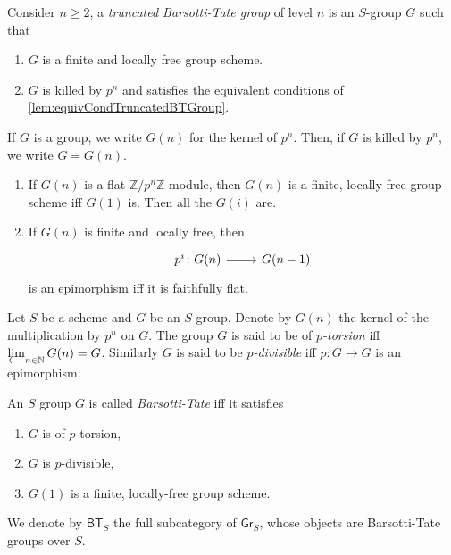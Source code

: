 \documentclass[../Main]{subfiles}
\begin{document}
\begin{defn}
	Consider $n \geq 2$, a {\em truncated Barsotti-Tate group} of level $n$
	is an $S$-group $G$ such that
\begin{enumerate}
	\item $G$ is a finite and locally free group scheme.
	\item $G$ is killed by $p^n$ and satisfies the equivalent conditions of 
		\cref{lem:equivCondTruncatedBTGroup}.
\end{enumerate}
\end{defn}


\begin{defn}[]
	If $G$ is a group, we write $G(n)$ for the kernel of $p^n$.
	Then, if $G$ is killed by $p^n$, we write $G = G(n)$.
\end{defn}


\begin{lem}\leavevmode\vspace{-.2\baselineskip}
\begin{enumerate}
	\item If $G(n)$ is a flat $\mathbb{Z}/p^n\mathbb{Z}$-module, then $G(n)$
		is a finite, locally-free group scheme iff
		$G(1)$ is. Then all the $G(i)$ are.

	\item If $G(n)$ is finite and locally free, then
		\begin{equation}
		\begin{tikzcd}[row sep = 0ex
			,/tikz/column 1/.append style={anchor=base east}
			,/tikz/column 2/.append style={anchor=base west}]
			p^i\colon G(n) \arrow[r, "", rightarrow] &
			G(n-1)
		\end{tikzcd}
		\end{equation} 
		is an epimorphism iff it is faithfully flat.
\end{enumerate}
\end{lem} 


\begin{defn}
	Let $S$ be a scheme and $G$ be an $S$-group.
	Denote by $G(n)$ the kernel of the multiplication by $p^n$ on $G$.
	The group $G$ is said to be of {\em $p$-torsion} iff $\varprojlim_{n \in \mathbb{N}} G(n) = G$.
	Similarly $G$ is said to be {\em $p$-divisible} iff $p\colon G \to G$
	is an epimorphism.
\end{defn}


\begin{defn}\label{BTGroup}
	An $S$ group $G$ is called {\em Barsotti-Tate} iff it satisfies
\begin{enumerate}
	\item $G$ is of $p$-torsion,
	\item $G$ is $p$-divisible,
	\item $G(1)$ is a finite, locally-free group scheme.
\end{enumerate}
	We denote by $\mathsf{BT}_S$ the full subcategory of $\mathsf{Gr}_S$,
	whose objects are Barsotti-Tate groups over $S$.
\end{defn}
\end{document}
